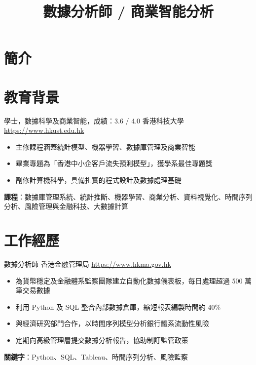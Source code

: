 \documentclass[a4paper, serif, 10pt]{moderncv}
\title{數據分析師 / 商業智能分析}
\begin{document}
\maketitle

\section{簡介}

\section{教育背景}

        {學士，數據科學及商業智能，成績：3.6 / 4.0}
        {香港科技大學}
        {\url{https://www.hkust.edu.hk}}
        {}
        {\begin{itemize}
\item 主修課程涵蓋統計模型、機器學習、數據庫管理及商業智能
\item 畢業專題為「香港中小企客戶流失預測模型」，獲學系最佳專題獎
\item 副修計算機科學，具備扎實的程式設計及數據處理基礎
\end{itemize}
\textbf{課程}：數據庫管理系統、統計推斷、機器學習、商業分析、資料視覺化、時間序列分析、風險管理與金融科技、大數據計算}
\section{工作經歷}

        {數據分析師}
        {香港金融管理局}
        {\url{https://www.hkma.gov.hk}}
        {}
        {\begin{itemize}
\item 為貨幣穩定及金融體系監察團隊建立自動化數據儀表板，每日處理超過 500 萬筆交易數據
\item 利用 Python 及 SQL 整合內部數據倉庫，縮短報表編製時間約 40\%
\item 與經濟研究部門合作，以時間序列模型分析銀行體系流動性風險
\item 定期向高級管理層提交數據分析報告，協助制訂監管政策
\end{itemize}
\textbf{關鍵字}：Python、SQL、Tableau、時間序列分析、風險監察}
\end{document}

